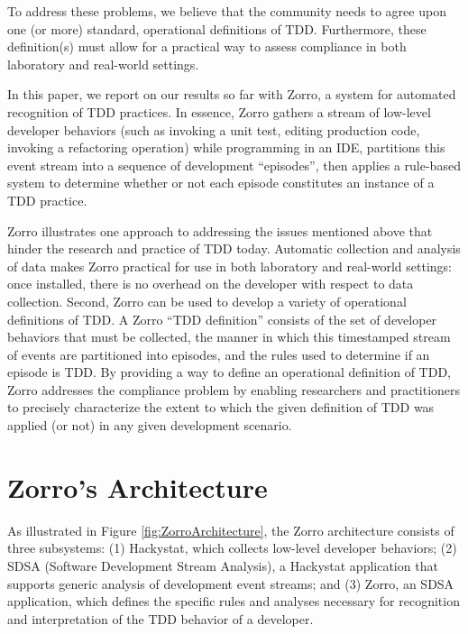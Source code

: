 \documentclass[smallextended]{svjour3}     %
\begin{document}
To address these problems, we believe that the community needs to agree
upon one (or more) standard, operational definitions of TDD. Furthermore,
these definition(s) must allow for a practical way to assess compliance in
both laboratory and real-world settings.

In this paper, we report on our results so far with Zorro, a system for
automated recognition of TDD practices.  In essence, Zorro gathers a stream
of low-level developer behaviors (such as invoking a unit test, editing
production code, invoking a refactoring operation) while programming in an
IDE, partitions this event stream into a sequence of development
``episodes'', then applies a rule-based system to determine whether or 
not each episode constitutes an instance of a TDD practice. 

Zorro illustrates one approach to addressing the 
issues mentioned above that hinder the research and practice of TDD today.
Automatic collection and analysis of data makes Zorro practical for use in
both laboratory and real-world settings: once installed, there is no
overhead on the developer with respect to data collection.  Second, Zorro
can be used to develop a variety of operational definitions
of TDD. A Zorro ``TDD definition'' consists of the set of developer behaviors
that must be collected, the manner in which this timestamped stream of
events are partitioned into episodes, and the rules used to determine if an
episode is TDD.  By providing a way to define an operational definition of
TDD, Zorro addresses the compliance problem by enabling researchers and
practitioners to precisely characterize the extent to which the given
definition of TDD was applied (or not) in any given development scenario.

\section{Zorro's Architecture}
\label{sec:sdsa}

As illustrated in Figure \ref{fig:ZorroArchitecture}, the Zorro
architecture consists of three subsystems: (1) Hackystat, which collects
low-level developer behaviors; (2) SDSA (Software Development Stream
Analysis), a Hackystat application that supports generic analysis of
development event streams; and (3) Zorro, an SDSA application, which
defines the specific rules and analyses necessary for recognition and
interpretation of the TDD behavior of a developer.
\end{document}
